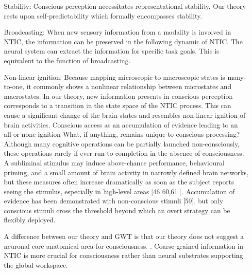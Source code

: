 \documentclass[utf8]{article}
\begin{document}
		
		Stability: Conscious perception necessitates representational stability. Our theory rests upon self-predictability which formally encompasses stability.
		
		
		Broadcasting: When new sensory information from a modality is involved in NTIC, the information can be preserved in the following dynamic of NTIC. The neural system can extract the information for specific task goals. This is equivalent to the function of broadcasting. 
		
		Non-linear ignition: Because mapping microscopic to macroscopic states is many-to-one, it commonly shows a nonlinear relationship between microstates and macrostates. In our theory, new information presents in conscious perception corresponds to a transition in the state space of the NTIC process. This can cause a significant change of the brain states and resembles non-linear ignition of brain activities. Conscious access as an accumulation of evidence leading to an all-or-none ignition What, if anything, remains unique to conscious processing? Although many cognitive operations can be partially launched non-consciously, these operations rarely if ever run to completion in the absence of consciousness. A subliminal stimulus may induce above-chance performance, behavioural priming, and a small amount of brain activity in narrowly deﬁned brain networks, but these measures often increase dramatically as soon as the subject reports seeing the stimulus, especially in high-level areas [46 60,61  ]. Accumulation of evidence has been demonstrated with non-conscious stimuli [59], but only conscious stimuli cross the threshold beyond which an overt strategy can be ﬂexibly deployed. 
		
		A difference between our theory and GWT is that our theory does not suggest a neuronal core anatomical area for consciousness. . Coarse-grained information in NTIC is more crucial for consciousness rather than neural substrates supporting the global workspace.
		
\end{document}
